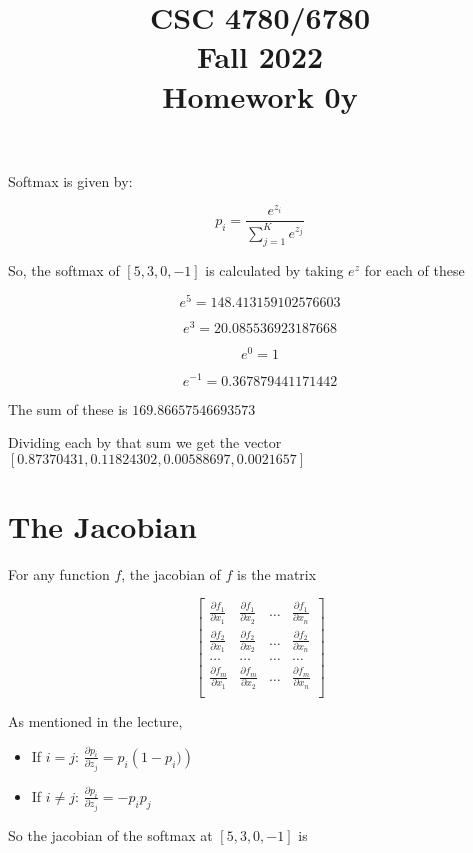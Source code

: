 \documentclass[11pt,english]{article}
\begin{document}
\title{CSC 4780/6780 \\
Fall 2022\\ Homework 0y}
\maketitle

Softmax is given by:

$$p_i = \frac{e^{z_i}}{\sum_{j=1}^K e^{z_j}}$$

So, the softmax of $[5, 3, 0, -1]$ is calculated by taking $e^z$ for each of these

$$e^5 = 148.413159102576603$$

$$e^3 = 20.085536923187668$$

$$e^0 = 1$$

$$ e^{-1} = 0.367879441171442$$

The sum of these is $169.86657546693573$

Dividing each by that sum we get the vector $[0.87370431, 0.11824302, 0.00588697, 0.0021657]$

\section{The Jacobian}

For any function $f$, the jacobian of $f$ is the matrix

$$\begin{bmatrix} 
\frac{\partial f_1}{\partial x_1}  &  \frac{\partial f_1}{\partial x_2} & \ldots &  \frac{\partial f_1}{\partial x_n} \\
\frac{\partial f_2}{\partial x_1}  &  \frac{\partial f_2}{\partial x_2} & \ldots &  \frac{\partial f_2}{\partial x_n} \\
\ldots & \ldots & \ldots & \ldots \\
\frac{\partial f_m}{\partial x_1}  &  \frac{\partial f_m}{\partial x_2} & \ldots &  \frac{\partial f_m}{\partial x_n} \\
\end{bmatrix}$$

As mentioned in the lecture,
\begin{itemize}
\item If $i = j$: $\frac{\partial p_i}{\partial z_j} = p_i \left(1 - p_i)\right)$
\item If $i \neq j$: $\frac{\partial p_i}{\partial z_j} = -p_i p_j$
\end{itemize}

So the jacobian of the softmax at  $[5, 3, 0, -1]$ is 
\end{document}
